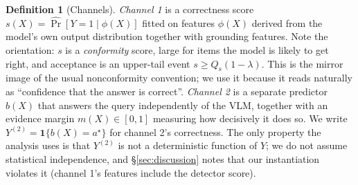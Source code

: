 \documentclass[review,number,doubleblind]{elsarticle}
\theoremstyle{plain}
\theoremstyle{definition}
\newtheorem{definition}{Definition}
\theoremstyle{remark}
\begin{document}
\begin{definition}[Channels]
\label{def:channels}
\emph{Channel 1} is a correctness score $s(X)=\widehat{\Pr}[Y=1\mid\phi(X)]$ fitted on
features $\phi(X)$ derived from the model's own output distribution together with grounding
features. Note the orientation: $s$ is a \emph{conformity} score, large for items the model
is likely to get right, and acceptance is an upper-tail event $s\ge Q_s(1-\lambda)$. This is
the mirror image of the usual nonconformity convention; we use it because it reads naturally
as ``confidence that the answer is correct''. \emph{Channel 2} is a separate predictor $b(X)$ that answers the query
independently of the VLM, together with an evidence margin $m(X)\in[0,1]$ measuring how
decisively it does so. We write $Y^{(2)}=\mathbf{1}\{b(X)=a^\star\}$ for channel 2's
correctness. The only property the analysis uses is that $Y^{(2)}$ is not a deterministic
function of $Y$; we do not assume statistical independence, and \S\ref{sec:discussion}
notes that our instantiation violates it (channel 1's features include the detector score).
\end{definition}
\end{document}
